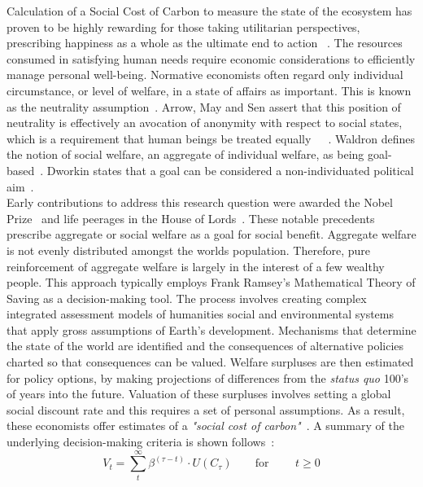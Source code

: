 \documentclass[12pt, oneside]{article}   	%
\begin{document}
Calculation of a Social Cost of Carbon to measure the state of the ecosystem has proven to be highly rewarding for those taking utilitarian perspectives, prescribing happiness as a whole as the ultimate end to action ~\cite{hs1}.
The resources consumed in satisfying human needs require economic considerations to efficiently manage personal well-being.
Normative economists often regard only individual circumstance, or level of  welfare, in a state of affairs as important.
This is known as the neutrality assumption~\cite{pd2}.
Arrow, May and Sen assert that this position of neutrality is effectively an avocation of anonymity with respect to social states, which is a requirement that human beings be treated equally~\cite{ka1}~\cite{km1}~\cite{as2}.
Waldron defines the notion of social welfare, an aggregate of individual welfare, as being goal-based~\cite{jw2}.
Dworkin states that a goal can be considered a non-individuated political aim~\cite{rd1}.\\

Early contributions to address this research question were awarded the Nobel Prize~\cite{np1} and life peerages in the House of Lords~\cite{g1}.
These notable precedents prescribe aggregate or social welfare as a goal for social benefit.
Aggregate welfare is not evenly distributed amongst the worlds population.
Therefore, pure reinforcement of aggregate welfare is largely in the interest of a few wealthy people.
This approach typically employs Frank Ramsey's Mathematical Theory of Saving as a decision-making tool.
The process involves creating complex integrated assessment models of humanities social and environmental systems that apply gross assumptions of Earth's development.
Mechanisms that determine the state of the world are identified and the consequences of alternative policies charted so that consequences can be valued.
Welfare surpluses are then estimated for policy options, by making projections of differences from the \emph{status quo} 100's of years into the future.
Valuation of these surpluses involves setting a global social discount rate and this requires a set of personal assumptions.
As a result, these economists offer estimates of a \emph{"social cost of carbon"}~\cite{pd2}.
A summary of the underlying decision-making criteria is shown follows~\cite{fr1}:\\

\begin{equation}
V_t = \sum_t^\infty \beta^{(\tau - t)} \cdot U (C_\tau)
\qquad \text{for }
\qquad t \geq 0
\end{equation}
\end{document}
